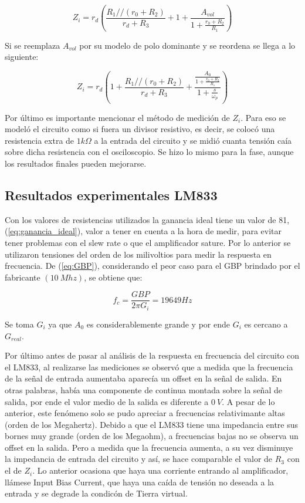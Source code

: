 \begin{equation}\label{eq:zin_real}
Z_i = r_d \left(\frac{R_1 // (r_0 + R_2)}{r_d + R_3} + 1 + \frac{A_{vol}}{1 + \frac{r_0 + R_2}{R_1}} \right)
\end{equation}

Si se reemplaza $A_{vol}$ por su modelo de polo dominante y se reordena se llega a lo siguiente:

\begin{equation}\label{eq:zin_completa}
Z_i = r_d \left(1 + \frac{R_1 // (r_0 + R_2)}{r_d + R_3} + \frac{\frac{A_0}{1 + \frac{r_0 + R_2}{R_1}}}{1 + \frac{s}{\omega_p}}\right)
\end{equation}

Por último es importante mencionar el método de medición de $Z_i$. Para eso se modeló el circuito como si fuera un divisor resistivo, es decir, se colocó una resistencia extra de $1k\Omega$ a la entrada del circuito y se midió cuanta tensión caía sobre dicha resistencia con el osciloscopio. Se hizo lo mismo para la fase, aunque los resultados finales pueden mejorarse. 


\subsection{Resultados experimentales LM833}

Con los valores de resistencias utilizados la ganancia ideal tiene un valor de 81, (\ref{eq:ganancia_ideal}), valor a tener en cuenta a la hora de medir, para evitar tener problemas con el slew rate o que el amplificador sature. Por lo anterior se utilizaron tensiones del orden de los milivoltios para medir la respuesta en frecuencia. De (\ref{eq:GBP}), considerando el peor caso para el GBP brindado por el fabricante $(10 \ Mhz)$, se obtiene que:

\begin{equation}\label{eq:frecuencia_corte_LM833}
f_c = \frac{GBP}{2\pi G_i} = 19649 Hz
\end{equation} 

Se toma $G_i$ ya que $A_0$ es considerablemente grande y por ende $G_i$ es cercano a $G_{real}$. 


Por último antes de pasar al análisis de la respuesta en frecuencia del circuito con el LM833, al realizarse las mediciones se observó que a medida que la frecuencia de la señal de entrada aumentaba aparecía un offset en la señal de salida. En otras palabras, había una componente de continua montada sobre la señal de salida, por ende el valor medio de la salida es diferente a $0 \ V$. A pesar de lo anterior, este fenómeno solo se pudo apreciar a frecuencias relativimante altas (orden de los Megahertz). Debido a que el LM833 tiene una impedancia entre sus bornes muy grande (orden de los Megaohm), a frecuencias bajas no se observa un offset en la salida. Pero a medida que la frecuencia aumenta, a su vez disminuye la impedancia de entrada del circuito y así, se hace comparable el valor de $R_3$ con el de $Z_i$. Lo anterior ocasiona que haya una corriente entrando al amplificador, llámese Input Bias Current, que haya una caída de tensión no deseada a la entrada y se degrade la condicón de Tierra virtual. 

